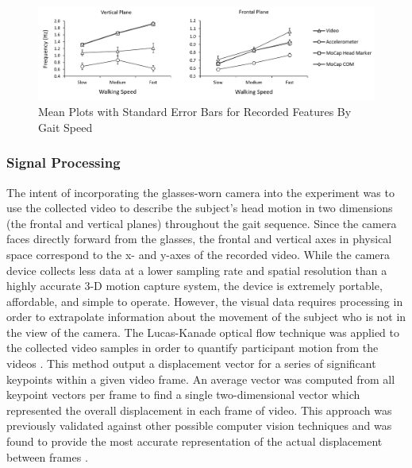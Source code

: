 \documentclass[12pt]{report}
\begin{document}
\begin{figure}
\centering
\includegraphics[width=7in]{figure/meanplots}
\caption{Mean Plots with Standard Error Bars for Recorded Features By Gait Speed}
\label{fig_meanPlots}
\end{figure}

\subsubsection{Signal Processing}
The intent of incorporating the glasses-worn camera into the experiment was to use the collected video to describe the subject's head motion in two dimensions (the frontal and vertical planes) throughout the gait sequence. Since the camera faces directly forward from the glasses, the frontal and vertical axes in physical space correspond to the x- and y-axes of the recorded video. While the camera device collects less data at a lower sampling rate and spatial resolution than a highly accurate 3-D motion capture system, the device is extremely portable, affordable, and simple to operate. However, the visual data requires processing in order to extrapolate information about the movement of the subject who is not in the view of the camera. The Lucas-Kanade optical flow technique was applied to the collected video samples in order to quantify participant motion from the videos \cite{Lucas1981AnVision}. This method output a displacement vector for a series of significant keypoints within a given video frame. An average vector was computed from all keypoint vectors per frame to find a single two-dimensional vector which represented the overall displacement in each frame of video. This approach was previously validated against other possible computer vision techniques and was found to provide the most accurate representation of the actual displacement between frames \cite{Schneider2017PreliminaryProcessing}.
\end{document}
